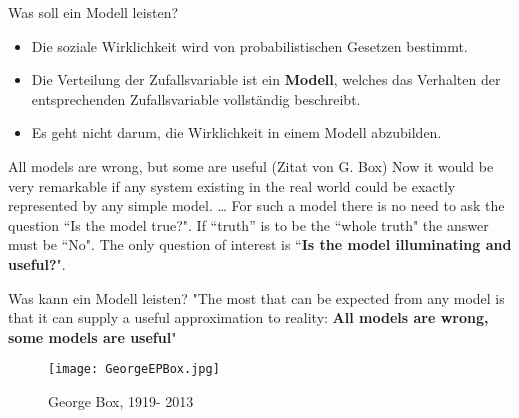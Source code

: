 \documentclass[usenames,dvipsnames,handout]{beamer}
\newcommand{\oldtextdied}{{\fontfamily{cmr}\selectfont\textdied}}
\newcommand{\oldtextborn}{{\fontfamily{cmr}\selectfont\textborn}}
\begin{document}
\begin{frame}{Was soll ein  Modell leisten?}
\begin{itemize}
\item{Die soziale Wirklichkeit wird von probabilistischen Gesetzen bestimmt.}\pause
\item{Die Verteilung der Zufallsvariable ist ein \textbf{ Modell}, welches das Verhalten der entsprechenden Zufallsvariable vollständig beschreibt.}\pause
\item{Es geht nicht darum, die Wirklichkeit in einem Modell abzubilden. }\pause
\end{itemize}
\begin{block}{All models are wrong, but some are useful (Zitat von G. Box)}
Now it would be very remarkable if any system existing in the real world could be exactly represented by any simple model.  \dots
For such a model there is no need to ask the question ``Is the model true?". If ``truth'' is to be the ``whole truth" the answer must be ``No". The only question of interest is ``\textbf{Is the model illuminating and useful?}".
\end{block}
\end{frame}
\begin{frame}{Was kann ein Modell leisten?}
"The most that can be expected from any model is that it can supply a useful approximation to reality: \textbf{All models are wrong, some models are useful}"
  \begin{figure}[ht]
 	\centering
 	      \texttt{[image: GeorgeEPBox.jpg]}
 	      \caption{George  Box, \oldtextborn 1919- \oldtextdied 2013}
 	\end{figure}
\end{frame}

\end{document}
